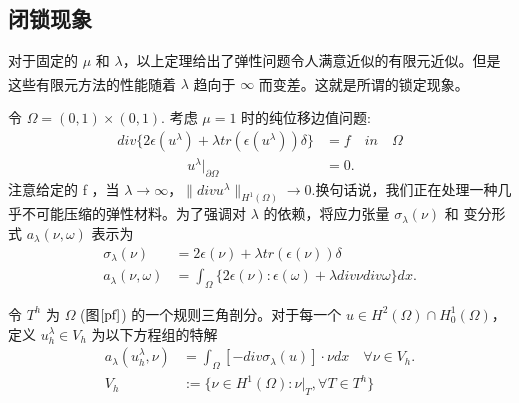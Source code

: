 \documentclass[a4paper,UTF8,titlepage]{ctexart}
\begin{document}
\subsection{闭锁现象}

	对于固定的 $\mu$ 和 $\lambda$，以上定理给出了弹性问题令人满意近似的有限元近似。但是这些有限元方法的性能随着 $\lambda$ 趋向于 $\infty$ 而变差。这就是所谓的锁定现象\textsuperscript{\cite{brenner2008mathematical}}。
	\par 
	令 $\Omega = (0,1) \times (0,1)$. 考虑 $\mu = 1$ 时的纯位移边值问题:
	\begin{equation}
	\begin{aligned}
		div \{ 2 \epsilon (u^{\lambda}) + \lambda tr (\epsilon (u^{\lambda})) \delta \} &= f \quad in \quad \Omega \\ \quad \quad \quad \quad \quad 
		u^{\lambda}|_{\partial \Omega} &=  0.
	\end{aligned}
	\end{equation}
	注意给定的 f ，当 $\lambda \to \infty$，$\| div u^{\lambda} \|_{H^1(\Omega)} \to 0$.换句话说，我们正在处理一种几乎不可能压缩的弹性材料。为了强调对 $\lambda$ 的依赖，将应力张量 $\sigma_{\lambda}(\nu)$ 和 变分形式 $a_{\lambda}(\nu,\omega)$ 表示为
	\begin{equation}
	\begin{aligned}
		\sigma_{\lambda}(\nu) &= 2 \epsilon(\nu) + \lambda tr (\epsilon(\nu)) \delta \\
		a_{\lambda}(\nu,\omega) &= \int_{\Omega} \{ 2 \epsilon(\nu) : \epsilon(\omega) + \lambda div \nu div \omega \} dx.
	\end{aligned}
	\end{equation}
	
	令 $T^h$ 为 $\Omega $ (图$\ref{pf}$) 的一个规则三角剖分。对于每一个 $u \in H^2(\Omega) \cap H_0^1(\Omega)$，定义 $u_h^{\lambda} \in V_h$ 为以下方程组的特解
	\begin{equation}
	\begin{aligned}
		a_{\lambda}(u_h^{\lambda},\nu) &= \int_{\Omega} 
		[ -div \sigma_{\lambda}(u) ] \cdot \nu dx \quad \forall \nu \in V_h. \\
		V_h &:= \{ \nu \in H^1(\Omega) : \nu |_{T}, \forall T \in T^h \}
	\end{aligned}
	\end{equation}
	
\end{document}
